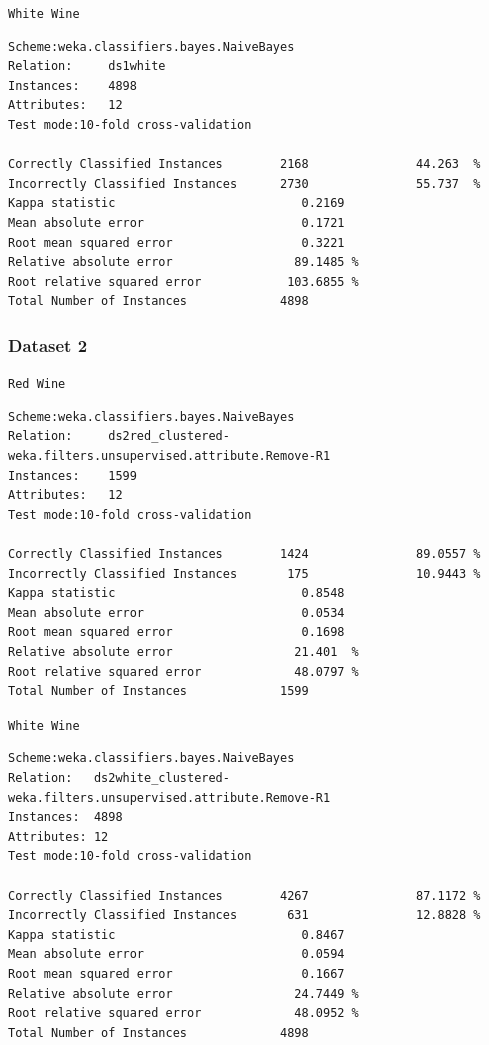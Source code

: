 \documentclass[a4paper,12pt,openany]{report}
\newenvironment{wekaconsole}[1][]{

	\par \noindent
	\begin{samepage}
	\texttt{#1}
	\begin{mdframed}
	\small
	\ttfamily
}{
	\end{mdframed}
	\end{samepage}
}
\begin{document}
\clearpage

\begin{wekaconsole}[White Wine]
\begin{verbatim}
Scheme:weka.classifiers.bayes.NaiveBayes 
Relation:     ds1white
Instances:    4898
Attributes:   12
Test mode:10-fold cross-validation

Correctly Classified Instances        2168               44.263  %
Incorrectly Classified Instances      2730               55.737  %
Kappa statistic                          0.2169
Mean absolute error                      0.1721
Root mean squared error                  0.3221
Relative absolute error                 89.1485 %
Root relative squared error            103.6855 %
Total Number of Instances             4898
\end{verbatim}
\end{wekaconsole}

\subsubsection*{Dataset 2}
\begin{wekaconsole}[Red Wine]
\begin{verbatim}
Scheme:weka.classifiers.bayes.NaiveBayes 
Relation:     ds2red_clustered-weka.filters.unsupervised.attribute.Remove-R1
Instances:    1599
Attributes:   12
Test mode:10-fold cross-validation

Correctly Classified Instances        1424               89.0557 %
Incorrectly Classified Instances       175               10.9443 %
Kappa statistic                          0.8548
Mean absolute error                      0.0534
Root mean squared error                  0.1698
Relative absolute error                 21.401  %
Root relative squared error             48.0797 %
Total Number of Instances             1599     
\end{verbatim}
\end{wekaconsole}

\clearpage

\begin{wekaconsole}[White Wine]
\begin{verbatim}
Scheme:weka.classifiers.bayes.NaiveBayes 
Relation:   ds2white_clustered-weka.filters.unsupervised.attribute.Remove-R1
Instances:  4898
Attributes: 12
Test mode:10-fold cross-validation

Correctly Classified Instances        4267               87.1172 %
Incorrectly Classified Instances       631               12.8828 %
Kappa statistic                          0.8467
Mean absolute error                      0.0594
Root mean squared error                  0.1667
Relative absolute error                 24.7449 %
Root relative squared error             48.0952 %
Total Number of Instances             4898
\end{verbatim}
\end{wekaconsole}
\end{document}
